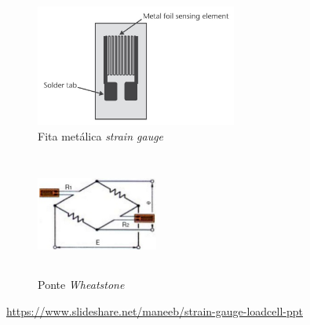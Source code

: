 \begin{minipage}[!b]{.6\linewidth}
\begin{figure}[H]
	\captionsetup{justification=raggedright,singlelinecheck=false}
	\flushleft
	\includegraphics[height=4cm]{./image/PESTA/general/strain_gauge_1.jpg}
	\caption{Fita metálica \textit{strain gauge} \cite{book-9}}
	\label{strain_gauge_1}
\end{figure}
\end{minipage}
\begin{minipage}[!b]{.4\linewidth}
\begin{figure}[H]
	\captionsetup{justification=raggedright,singlelinecheck=false}
	\flushleft
	\vspace{1cm}
	\includegraphics[height=4cm, width=4cm]{./image/PESTA/schematic/Wheatstone-1.png}
	\qquad \caption{Ponte \textit{Wheatstone}}
	\label{wheatstone-1}
\end{figure}
\end{minipage}
\hspace*{1cm}\url{https://www.slideshare.net/maneeb/strain-gauge-loadcell-ppt}

